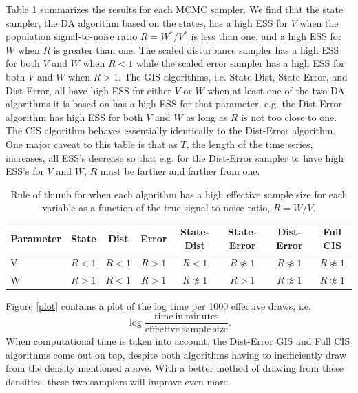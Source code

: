 \documentclass{article}\usepackage[]{graphicx}\usepackage[]{color}
\begin{document}
Table \ref{tab:stnmix} summarizes the results for each MCMC sampler. We find that the state sampler, the DA algorithm based on the states, has a high ESS for $V$ when the population signal-to-noise ratio $R=W^*/V^*$ is less than one, and a high ESS for $W$ when $R$ is greater than one. The scaled disturbance sampler has a high ESS for both $V$ and $W$ when $R<1$ while the scaled error sampler has a high ESS for both $V$ and $W$ when $R>1$. The GIS algorithms, i.e. State-Dist, State-Error, and Dist-Error, all have high ESS for either $V$ or $W$ when at least one of the two DA algorithms it is based on has a high ESS for that parameter, e.g. the Dist-Error algorithm has high ESS for both $V$ and $W$ as long as $R$ is not too close to one. The CIS algorithm behaves essentially identically to the Dist-Error algorithm. One major caveat to this table is that as $T$, the length of the time series, increases, all ESS's decrease so that e.g. for the Dist-Error sampler to have high ESS's for $V$ and $W$, $R$ must be farther and farther from one.

\begin{table}
  \centering
  \begin{tabular}{|l|ccccccc|}\hline
    Parameter & State & Dist & Error  & State-Dist        & State-Error       & Dist-Error        & Full CIS \\\hline
    V & $R < 1$ & $R < 1$ & $R > 1$ & $R < 1$           & $R \not\approx 1$ & $R \not\approx 1$ & $R \not\approx 1$ \\
    W & $R > 1$ & $R < 1$ & $R > 1$ & $R \not\approx 1$ & $R > 1$           & $R \not\approx 1$ &  $R \not\approx 1$\\\hline
  \end{tabular}
  \caption{Rule of thumb for when each algorithm has a high effective sample size for each variable as a function of the true signal-to-noise ratio, $R=W/V$.}
  \label{tab:stnmix}
\end{table}




Figure \ref{plot} contains a plot of the log time per 1000 effective draws, i.e.
\[
\log\frac{\mathrm{time\ in\ minutes}}{\mathrm{effective\ sample\ size}}.
\]
When computational time is taken into account, the Dist-Error GIS and Full CIS algorithms come out on top, despite both algorithms having to inefficiently draw from the density mentioned above. With a better method of drawing from these densities, these two samplers will improve even more.
\end{document}
